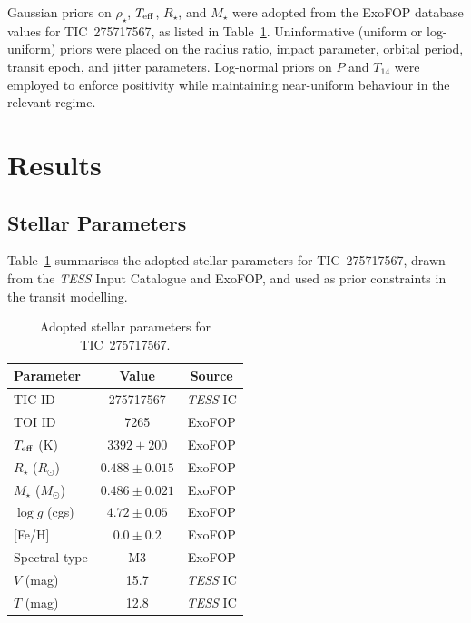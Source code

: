 \documentclass[fleqn,usenatbib]{mnras}
\newcommand{\Msun}{M_{\odot}}
\newcommand{\Rsun}{R_{\odot}}
\newcommand{\Teff}{T_{\rm eff}}
\newcommand{\logg}{\log g}
\newcommand{\rhostar}{\rho_{\star}}
\begin{document}
Gaussian priors on $\rhostar$, $\Teff$, $R_{\star}$, and $M_{\star}$ were adopted from the ExoFOP database values for TIC~275717567, as listed in Table~\ref{tab:stellarparams}. Uninformative (uniform or log-uniform) priors were placed on the radius ratio, impact parameter, orbital period, transit epoch, and jitter parameters. Log-normal priors on $P$ and $T_{14}$ were employed to enforce positivity while maintaining near-uniform behaviour in the relevant regime.

\section{Results}
\label{sec:results}

\subsection{Stellar Parameters}
\label{sec:stellar}

Table~\ref{tab:stellarparams} summarises the adopted stellar parameters for TIC~275717567, drawn from the \textit{TESS} Input Catalogue and ExoFOP, and used as prior constraints in the transit modelling.

\begin{table}
  \caption{Adopted stellar parameters for TIC~275717567.}
  \label{tab:stellarparams}
  \begin{tabular}{lcc}
    \toprule
    Parameter & Value & Source \\
    \midrule
    TIC ID & 275717567 & \textit{TESS} IC \\
    TOI ID & 7265 & ExoFOP \\
    $\Teff$ (K) & $3392 \pm 200$ & ExoFOP \\
    $R_{\star}$ ($\Rsun$) & $0.488 \pm 0.015$ & ExoFOP \\
    $M_{\star}$ ($\Msun$) & $0.486 \pm 0.021$ & ExoFOP \\
    $\logg$ (cgs) & $4.72 \pm 0.05$ & ExoFOP \\
    {[Fe/H]} & $0.0 \pm 0.2$ & ExoFOP \\
    Spectral type & M3 & ExoFOP \\
    $V$ (mag) & 15.7 & \textit{TESS} IC \\
    $T$ (mag) & 12.8 & \textit{TESS} IC \\
    \bottomrule
  \end{tabular}
\end{table}
\end{document}
